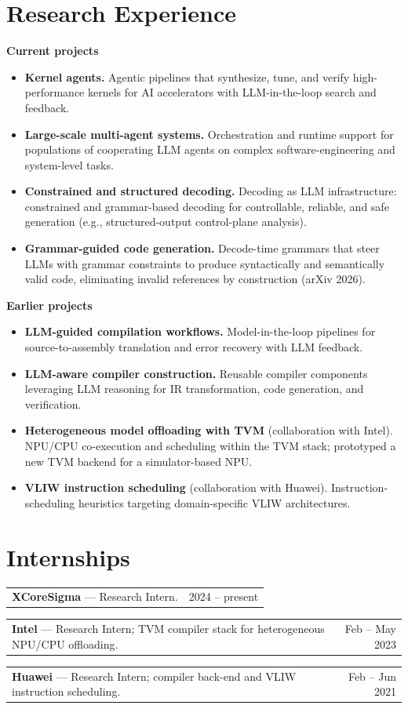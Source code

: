 \documentclass[11pt]{article}
\makeatletter
\newcommand{\datedline}[2]{%
  \noindent\begin{tabularx}{\textwidth}{@{}X@{}r@{}}
  #1 & {\small #2}
  \end{tabularx}\par}
\makeatother
\begin{document}
\section{Research Experience}
\textbf{Current projects}
\begin{itemize}
  \item \textbf{Kernel agents.} Agentic pipelines that synthesize, tune, and verify high-performance kernels for AI accelerators with LLM-in-the-loop search and feedback.
  \item \textbf{Large-scale multi-agent systems.} Orchestration and runtime support for populations of cooperating LLM agents on complex software-engineering and system-level tasks.
  \item \textbf{Constrained and structured decoding.} Decoding as LLM infrastructure: constrained and grammar-based decoding for controllable, reliable, and safe generation (e.g., structured-output control-plane analysis).
  \item \textbf{Grammar-guided code generation.} Decode-time grammars that steer LLMs with grammar constraints to produce syntactically and semantically valid code, eliminating invalid references by construction (arXiv 2026).
\end{itemize}
\vspace{0.4ex}
\textbf{Earlier projects}
\begin{itemize}
  \item \textbf{LLM-guided compilation workflows.} Model-in-the-loop pipelines for source-to-assembly translation and error recovery with LLM feedback.
  \item \textbf{LLM-aware compiler construction.} Reusable compiler components leveraging LLM reasoning for IR transformation, code generation, and verification.
  \item \textbf{Heterogeneous model offloading with TVM} (collaboration with Intel). NPU/CPU co-execution and scheduling within the TVM stack; prototyped a new TVM backend for a simulator-based NPU.
  \item \textbf{VLIW instruction scheduling} (collaboration with Huawei). Instruction-scheduling heuristics targeting domain-specific VLIW architectures.
\end{itemize}

\section{Internships}
\datedline{\textbf{XCoreSigma} --- Research Intern.}{2024 -- present}
\datedline{\textbf{Intel} --- Research Intern; TVM compiler stack for heterogeneous NPU/CPU offloading.}{Feb -- May 2023}
\datedline{\textbf{Huawei} --- Research Intern; compiler back-end and VLIW instruction scheduling.}{Feb -- Jun 2021}
\end{document}
